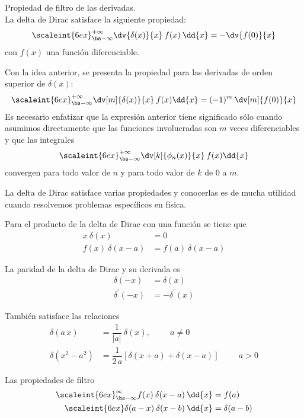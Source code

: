 \begin{propiedad}
Propiedad de filtro de las derivadas.
\\
La delta de Dirac satisface la siguiente propiedad:
\[ \scaleint{6ex}_{\bs -\infty}^{+\infty} \dv{\delta(x)}{x} \: f (x) \: \dd{x} = - \dv{f (0)}{x} \]
con $f (x)$ una función diferenciable.
\par
Con la idea anterior, se presenta la propiedad para las derivadas de orden superior de $\delta (x)$:
\begin{align*}
\scaleint{6ex}_{\bs -\infty}^{+\infty} \dv[m]{\delta (x)}{x} \: f (x) \dd{x} =  (-1)^{m} \: \dv[m]{f (0)}{x}
\end{align*}
Es necesario enfatizar que la expresión anterior tiene significado sólo cuando asumimos directamente que las funciones involucradas son $m$ veces diferenciables y que las integrales
\begin{align*}
\scaleint{6ex}_{\bs -\infty}^{+\infty} \dv[k]{\phi_{n}(x)}{x} \: f (x) \dd{x}
\end{align*}
convergen para todo valor de $n$ y para todo valor de $k$ de $0$ a $m$.
\end{propiedad}

La delta de Dirac satisface varias propiedades y conocerlas es de mucha utilidad cuando resolvemos problemas específicos en física. 
\par
\begin{propiedad}
Para el producto de la delta de Dirac con una función se tiene que
\begin{align}
x \: \delta(x) &= 0 \\
f (x) \: \delta(x - a) &= f(a) \: \delta(x - a)
\end{align}
\end{propiedad}
\begin{propiedad}
La paridad de la delta de Dirac y su derivada es
\begin{align}
\delta (-x) &= \delta (x) \\
\delta^{\prime} (-x) &= - \delta^{\prime} (x)
\end{align}
\end{propiedad}
\begin{propiedad}
También satisface las relaciones
\begin{align}
\delta(a \, x) &= \dfrac{1}{\vert a \vert} \: \delta (x), \hspace{1cm} a \neq 0 \\
\delta (x^{2} - a^{2}) &= \dfrac{1}{2 \, a} \left[ \delta (x + a) + \delta (x - a) \right] \hspace{1cm} a > 0
\end{align}
\end{propiedad}
\begin{propiedad}
Las propiedades de filtro
\begin{align}
\scaleint{6ex}_{\bs -\infty}^{\infty} f (x) \: \delta (x - a) \: \dd{x} &= f(a) \\
\scaleint{6ex} \delta (a - x) \: \delta (x - b) \: \dd{x} &= \delta (a - b)
\end{align}
\end{propiedad}

